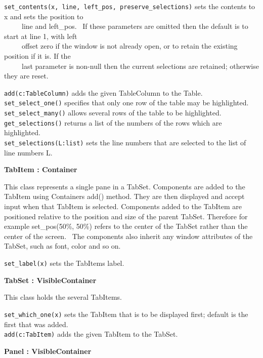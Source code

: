 \texttt{set\_contents(x, line, left\_pos, preserve\_selections)} sets the
contents to x and sets the position to\\
 \ \ \ \ \ line and left\_pos. \ If these parameters are omitted then
the default is to start at line 1, with left\\
 \ \ \ \ \ offset zero if the window is not already open, or to retain
the existing position if it is. If the\\
 \ \ \ \ \ last parameter is non-null then the current selections are
retained; otherwise they are reset.

\texttt{add(c:TableColumn)} adds the given TableColumn to the Table.\\
\texttt{set\_select\_one()} specifies that only one row of the table may be
highlighted.\\
\texttt{set\_select\_many()} allows several rows of the table to be
highlighted.\\
\texttt{get\_selections()} returns a list of the numbers of the rows which are
highlighted.\\
\texttt{set\_selections(L:list)} sets the line numbers that are selected to the
list of line numbers L.

{\ttfamily\bfseries
{}TabItem : Container}

This class represents a single pane in a TabSet. Components are added to
the TabItem using Container{\textquotesingle}s add() method. They are
then displayed and accept input when that TabItem is selected.
Components added to the TabItem are positioned relative to the position
and size of the parent TabSet. Therefore for example
set\_pos({\textquotedbl}50\%{\textquotedbl},
{\textquotedbl}50\%{\textquotedbl}) refers to the center of the TabSet
rather than the center of the screen. \ The components also inherit any
window attributes of the TabSet, such as font, color and so on.

\texttt{set\_label(x)} sets the TabItem{\textquotesingle}s label.

{\ttfamily\bfseries
{}TabSet : VisibleContainer}

This class holds the several TabItems.

\texttt{set\_which\_one(x)} sets the TabItem that is to be displayed first;
default is the first that was added.\\
\texttt{add(c:TabItem)} adds the given TabItem to the TabSet.

{\ttfamily\bfseries
{}Panel : VisibleContainer}

